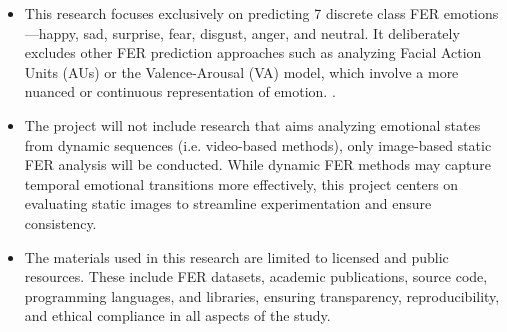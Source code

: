 
 

\begin{itemize}
\item This research focuses exclusively on predicting 7 discrete class FER emotions —happy, sad, surprise, fear, disgust, anger, and neutral. It deliberately excludes other FER prediction approaches such as analyzing Facial Action Units (AUs) or the Valence-Arousal (VA) model, which involve a more nuanced or continuous representation of emotion. \cite{mollahosseini_affectnet_2019}\cite{kollias_affect_2021}.

\item The project will not include research that aims analyzing emotional states from dynamic sequences (i.e. video-based methods)\cite{wang_survey_2024}, only image-based static FER analysis will be conducted. While dynamic FER methods may capture temporal emotional transitions more effectively, this project centers on evaluating static images to streamline experimentation and ensure consistency.

\item The materials used in this research are limited to licensed and public resources. These include FER datasets, academic publications, source code, programming languages, and libraries, ensuring transparency, reproducibility, and ethical compliance in all aspects of the study.
\end{itemize}